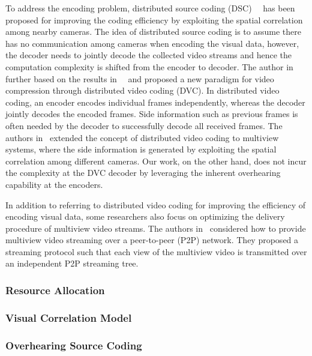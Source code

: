 To address the encoding problem, distributed source coding (DSC)~\cite{SlepianWolf}~\cite{WynerZiv} has been proposed for improving the coding efficiency by exploiting the spatial correlation among nearby cameras.
The idea of distributed source coding is to assume there has no communication among cameras when encoding the visual data, however, the decoder needs to jointly decode the collected video streams and hence the computation complexity is shifted from the encoder to decoder.
The author in~\cite{DVC} further based on the results in~\cite{SlepianWolf}~\cite{WynerZiv} and proposed a new paradigm for video compression through distributed video coding (DVC).
In distributed video coding, an encoder encodes individual frames independently, whereas the decoder jointly decodes the encoded frames.
Side information such as previous frames is often needed by the decoder to successfully decode all received frames.
The authors in~\cite{DVCinMVC} extended the concept of distributed video coding to multiview systems, where the side information is generated by exploiting the spatial correlation among different cameras.
Our work, on the other hand, does not incur the complexity at the DVC decoder by leveraging the inherent overhearing capability at the encoders.

In addition to referring to distributed video coding for improving the efficiency of encoding visual data, some researchers also focus on optimizing the delivery procedure of multiview video streams.
The authors in~\cite{P2Pstreaming} considered how to provide multiview video streaming over a peer-to-peer (P2P) network.
They proposed a streaming protocol such that each view of the multiview video is transmitted over an independent P2P streaming tree.

%
\subsubsection{Resource Allocation}
%
\subsubsection{Visual Correlation Model}
%
\subsubsection{Overhearing Source Coding}

